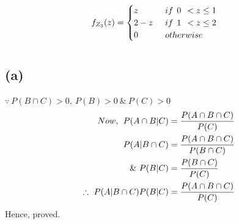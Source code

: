 \documentclass[a4paper,fleqn,11pt]{article}
\theoremstyle{mytheor}
\begin{document}
\begin{align*}
f_{Z_3}(z) & = \begin{cases}
					z \hspace{1ex} & if \hspace{1ex} 0 \hspace{1ex} < z \leq 1 \\
					2 - z \hspace{1ex} & if \hspace{1ex} 1 \hspace{1ex} < z \leq 2 \\
					0 \hspace{1ex} & otherwise
				\end{cases}
\end{align*}
\section{}
\subsection*{(a)}
$\because\ P (B \cap C) > 0,\ P (B) > 0\ \&\ P (C) > 0$
\begin{align*}
Now, \hspace{1ex} P (A \cap B | C) & = \frac{P(A \cap B \cap C)}{P(C)} \\
P(A | B \cap C) & = \frac{P(A \cap B \cap C)}{P(B \cap C)} \\
\&\ P(B | C) & = \frac{P(B \cap C)}{P(C)} \\
\therefore\ P(A | B \cap C)P(B | C) & = \frac{P(A \cap B \cap C)}{P(C)}
\end{align*}
Hence, proved.
\end{document}
